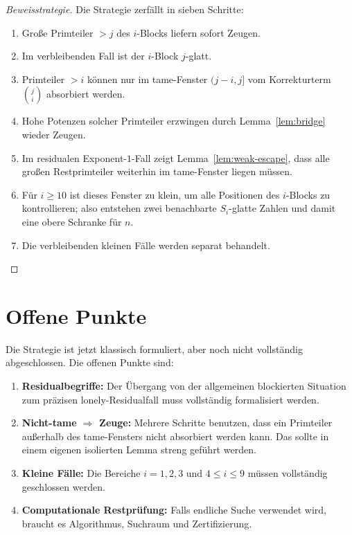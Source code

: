 \documentclass[12pt,a4paper]{article}
\theoremstyle{plain}
\theoremstyle{definition}
\theoremstyle{remark}
\begin{document}
	\begin{proof}[Beweisstrategie]
		Die Strategie zerfällt in sieben Schritte:
		\begin{enumerate}[label=\arabic*)]
			\item Große Primteiler \(>j\) des \(i\)-Blocks liefern sofort Zeugen.
			\item Im verbleibenden Fall ist der \(i\)-Block \(j\)-glatt.
			\item Primteiler \(>i\) können nur im tame-Fenster \((j-i,j]\) vom Korrekturterm \(\binom ji\) absorbiert werden.
			\item Hohe Potenzen solcher Primteiler erzwingen durch Lemma~\ref{lem:bridge} wieder Zeugen.
			\item Im residualen Exponent-\(1\)-Fall zeigt Lemma~\ref{lem:weak-escape}, dass alle großen Restprimteiler weiterhin im tame-Fenster liegen müssen.
			\item Für \(i\ge10\) ist dieses Fenster zu klein, um alle Positionen des \(i\)-Blocks zu kontrollieren; also entstehen zwei benachbarte \(S_i\)-glatte Zahlen und damit eine obere Schranke für \(n\).
			\item Die verbleibenden kleinen Fälle werden separat behandelt.
		\end{enumerate}
	\end{proof}
	
	\section{Offene Punkte}
	
	Die Strategie ist jetzt klassisch formuliert, aber noch nicht vollständig abgeschlossen. Die offenen Punkte sind:
	
	\begin{enumerate}[label=\arabic*)]
		\item \textbf{Residualbegriffe:}  
		Der Übergang von der allgemeinen blockierten Situation zum präzisen lonely-Residualfall muss vollständig formalisiert werden.
		
		\item \textbf{Nicht-tame \(\Rightarrow\) Zeuge:}  
		Mehrere Schritte benutzen, dass ein Primteiler außerhalb des tame-Fensters nicht absorbiert werden kann. Das sollte in einem eigenen isolierten Lemma streng geführt werden.
		
		\item \textbf{Kleine Fälle:}  
		Die Bereiche \(i=1,2,3\) und \(4\le i\le9\) müssen vollständig geschlossen werden.
		
		\item \textbf{Computationale Restprüfung:}  
		Falls endliche Suche verwendet wird, braucht es Algorithmus, Suchraum und Zertifizierung.
	\end{enumerate}
	
\end{document}

